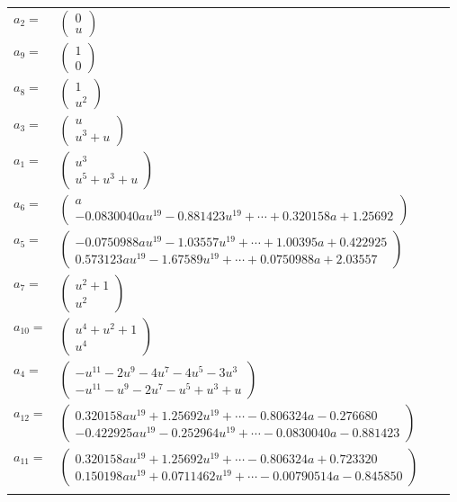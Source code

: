 \documentclass[1p]{elsarticle_modified}
\theoremstyle{definition}
\begin{document}
\begin{tabular}{m{7pt} m{180pt} m{7pt} m{180pt} }
\flushright $a_{2}=$&$\begin{pmatrix}0\\u\end{pmatrix}$ \\
\flushright $a_{9}=$&$\begin{pmatrix}1\\0\end{pmatrix}$ \\
\flushright $a_{8}=$&$\begin{pmatrix}1\\u^2\end{pmatrix}$ \\
\flushright $a_{3}=$&$\begin{pmatrix}u\\u^3+u\end{pmatrix}$ \\
\flushright $a_{1}=$&$\begin{pmatrix}u^3\\u^5+u^3+u\end{pmatrix}$ \\
\flushright $a_{6}=$&$\begin{pmatrix}a\\-0.0830040 a u^{19}-0.881423 u^{19}+\cdots+0.320158 a+1.25692\end{pmatrix}$ \\
\flushright $a_{5}=$&$\begin{pmatrix}-0.0750988 a u^{19}-1.03557 u^{19}+\cdots+1.00395 a+0.422925\\0.573123 a u^{19}-1.67589 u^{19}+\cdots+0.0750988 a+2.03557\end{pmatrix}$ \\
\flushright $a_{7}=$&$\begin{pmatrix}u^2+1\\u^2\end{pmatrix}$ \\
\flushright $a_{10}=$&$\begin{pmatrix}u^4+u^2+1\\u^4\end{pmatrix}$ \\
\flushright $a_{4}=$&$\begin{pmatrix}- u^{11}-2 u^9-4 u^7-4 u^5-3 u^3\\- u^{11}- u^9-2 u^7- u^5+u^3+u\end{pmatrix}$ \\
\flushright $a_{12}=$&$\begin{pmatrix}0.320158 a u^{19}+1.25692 u^{19}+\cdots-0.806324 a-0.276680\\-0.422925 a u^{19}-0.252964 u^{19}+\cdots-0.0830040 a-0.881423\end{pmatrix}$ \\
\flushright $a_{11}=$&$\begin{pmatrix}0.320158 a u^{19}+1.25692 u^{19}+\cdots-0.806324 a+0.723320\\0.150198 a u^{19}+0.0711462 u^{19}+\cdots-0.00790514 a-0.845850\end{pmatrix}$\\&\end{tabular}
\end{document}
